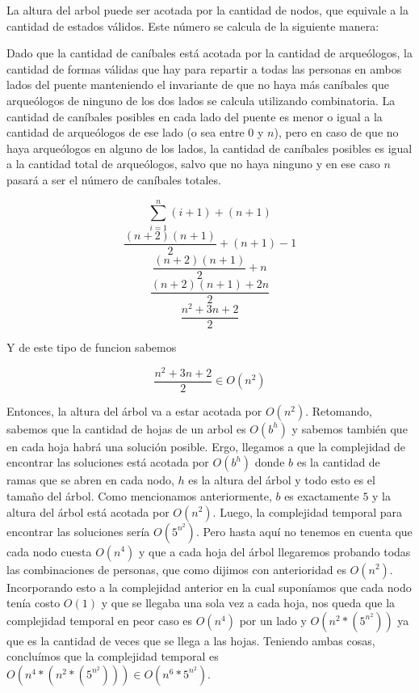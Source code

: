       La altura del arbol puede ser acotada por la cantidad de nodos, que equivale a la cantidad de estados válidos. Este número se calcula de la siguiente manera:

      Dado que la cantidad de caníbales está acotada por la cantidad de arqueólogos, la cantidad de formas válidas que hay para repartir a todas las personas en ambos lados del puente manteniendo el invariante de que no haya más caníbales que arqueólogos de ninguno de los dos lados se calcula utilizando combinatoria. La cantidad de caníbales posibles en cada lado del puente es menor o igual a la cantidad de arqueólogos de ese lado (o sea entre $0$ y $n$), pero en caso de que no haya arqueólogos en alguno de los lados, la cantidad de caníbales posibles es igual a la cantidad total de arqueólogos, salvo que no haya ninguno y en ese caso $n$ pasará a ser el número de caníbales totales.

      \[
      \sum_{i=1}^{n}(i+1) + (n+1)
      \]
      \[
      \frac{(n+2)(n+1)}{2} + (n+1) - 1
      \]
      \[
      \frac{(n+2)(n+1)}{2} + n
      \]
      \[
      \frac{(n+2)(n+1)+2n}{2}
      \]
      \[
      \frac{n^2+3n+2}{2}
      \]

      Y de este tipo de funcion sabemos \newline

      \[
      \frac{n^2+3n+2}{2} \in O(n^2)
      \]

      Entonces, la altura del árbol va a estar acotada por $O(n^2)$.
      Retomando, sabemos que la cantidad de hojas de un arbol es $O(b^h)$ y sabemos también que en cada hoja habrá una solución posible. Ergo, llegamos a que la complejidad de encontrar las soluciones está acotada por $O(b^h)$ donde $b$ es la cantidad de ramas que se abren en cada nodo, $h$ es la altura del árbol y todo esto es el tamaño del árbol. Como mencionamos anteriormente, $b$ es exactamente $5$ y la altura del árbol está acotada por $O(n^2)$. Luego, la complejidad temporal para encontrar las soluciones sería $O(5^{n^2})$. Pero hasta aquí no tenemos en cuenta que cada nodo cuesta $O(n^4)$ y que a cada hoja del árbol llegaremos probando todas las combinaciones de personas, que como dijimos con anterioridad es $O(n^2)$. Incorporando esto a la complejidad anterior en la cual suponíamos que cada nodo tenía costo $O(1)$ y que se llegaba una sola vez a cada hoja, nos queda que la complejidad temporal en peor caso es $O(n^4)$ por un lado y $O(n^2*(5^{n^2}))$ ya que es la cantidad de veces que se llega a las hojas. Teniendo ambas cosas, concluímos que la complejidad temporal es $O(n^4 * (n^2*(5^{n^2}))) \in O(n^6 * 5^{n^2})$.

